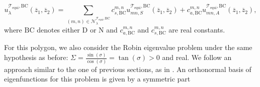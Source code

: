 \documentclass{amsart}
\theoremstyle{definition}
\theoremstyle{remark}
\numberwithin{equation}{section}
\theoremstyle{definition}
\theoremstyle{remark}
\begin{document}
\begin{equation}
	u_\lambda^{\mathcal{T}_\mathrm{equi},\mathrm{BC}}\left(\overline{z}_1,\overline{z}_2\right)=\sum_{(m,n)\in	\mathcal{N}_\lambda^{\mathcal{T}_\mathrm{equi},\mathrm{BC}}}c_{s,\mathrm{BC}}^{m,n}u^{\mathcal{T}_\mathrm{equi},\mathrm{BC}}_{mn,S}(\overline{z}_1,\overline{z}_2)+c_{a,\mathrm{BC}}^{m,n}u^{\mathcal{T}_\mathrm{equi},\mathrm{BC}}_{mn,A}(\overline{z}_1,\overline{z}_2),
\end{equation}
where $\mathrm{BC}$ denotes either $\mathrm{D}$ or $\mathrm{N}$ and $c_{a,\mathrm{BC}}^{m,n}$ and $c_{s,\mathrm{BC}}^{m,n}$ are real constants.

For this polygon, we also consider the Robin eigenvalue problem under the same hypothesis as before: $\Sigma=\frac{\sin(\sigma)}{\cos(\sigma)}=\tan(\sigma)>0$ and real. We follow an approach similar to the one of previous sections, as in \cite{trigIII}. An orthonormal basis of eigenfunctions for this problem is given by a symmetric part 
\end{document}
